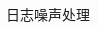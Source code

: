 \documentclass[CJK,final,t]{beamer}
\begin{document}
\begin{frame}{}
\begin{columns}[t]
\begin{column}{.3\linewidth}
\begin{block}{日志噪声处理}
      \end{block}
      

\end{column}
\end{columns}
\end{frame}
\end{document}

